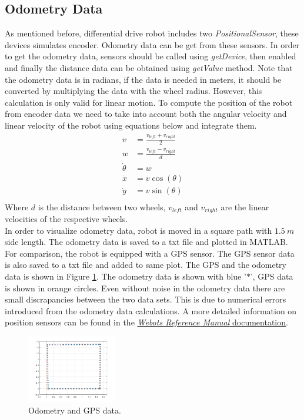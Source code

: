 \documentclass[11pt]{article}
\begin{document}
    \subsection{Odometry Data}
    As mentioned before, differential drive robot includes two \emph{PositionalSensor}, these devices simulates encoder. Odometry data can be get from these sensors. In order to get the odometry data, sensors should be called using \emph{getDevice}, then enabled and finally the distance data can be obtained using \emph{getValue} method.
    Note that the odometry data is in radians, if the data is needed in meters, it should be converted by multiplying the data with the wheel radius. However, this calculation is only valid for linear motion. To compute the position of the robot from encoder data we
    need to take into account both the angular velocity and linear velocity of the robot using equations below and integrate them.
    \begin{align}
        v &= \frac{v_{left} + v_{right}}{2} \\
        w &= \frac{v_{left} - v_{right}}{d} \\
        \dot{\theta} &= w \\
        \dot{x} &= v \cos(\theta) \\
        \dot{y} &= v \sin(\theta) \\
    \end{align}
    Where $d$ is the distance between two wheels, $v_{left}$ and  $v_{right}$ are the linear velocities of the respective wheels.  \\
    In order to visualize odometry data, robot is moved in a square path with $1.5 \ m$ side length. The odometry data is saved to a txt file and plotted in MATLAB. 
    For comparison, the robot is equipped with a GPS sensor. The GPS sensor data is also saved to a txt file and added to same plot. The GPS and the odometry data is shown in Figure \ref{fig:odometry}.
    The odometry data is shown with blue '$*$', GPS data is shown in orange circles. Even without noise in the odometry data there are small discrapancies between the two data sets. This is due to numerical errors introduced from the odometry data calculations.
    A more detailed information on position sensors can be found in the \href{https://cyberbotics.com/doc/reference/positionsensor}{\emph{Webots Reference Manual} documentation}.
    \begin{figure}[ht!]
        \centering
        \includegraphics[width = 0.35\textwidth]{odometry_data.png}
        \caption{Odometry and GPS data.}
        \label{fig:odometry}
    \end{figure}
    
\end{document}
